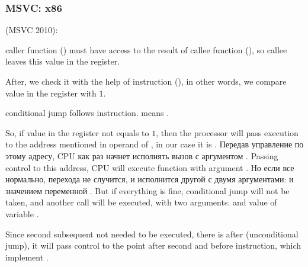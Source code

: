 \subsubsection{MSVC: x86}

 (MSVC 2010):



{\Gls{caller} function (\main) must have access to the result of \gls{callee} function (\scanf), 
so \gls{callee} leaves this value in the \EAX register.}

{After, we check it with the help of instruction  (),
in other words, we compare value in the \EAX register with $1$.} 

{\JNE conditional jump follows \CMP instruction. \JNE means .}

{So, if value in the \EAX register not equals to $1$, then the processor will pass execution to the 
address mentioned in operand of \JNE, in our case it is .}
\IFRU
{Передав управление по этому адресу, \ac{CPU} как раз начнет исполнять вызов \printf с 
аргументом .}
{Passing control to this address, \ac{CPU} will execute function \printf 
with argument .}
\IFRU
{Но если все нормально, перехода не случится, и исполнится другой \printf с двумя аргументами: 
 и значением переменной .}
{But if everything is fine, conditional jump will not be taken, and another \printf call 
will be executed, with two arguments:  and value of variable . }

{Since second subsequent \printf not needed to be executed, there is \JMP after (unconditional jump),
it will pass control to the point after second \printf and before  instruction, 
which implement .}

